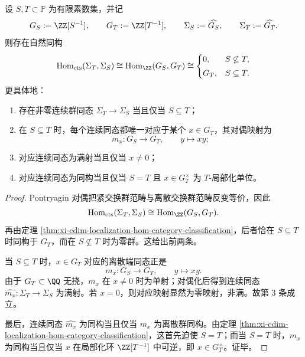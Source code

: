 \begin{theorem}\label{thm:xi-time-part60e-solenoid-terminal-morphism-classification}
设 \(S,T\subset\mathbb P\) 为有限素数集，并记
\[
G_S:=\ZZ[S^{-1}],
\qquad
G_T:=\ZZ[T^{-1}],
\qquad
\Sigma_S:=\widehat{G_S},
\qquad
\Sigma_T:=\widehat{G_T}.
\]
则存在自然同构
\[
\operatorname{Hom}_{\mathrm{cts}}(\Sigma_T,\Sigma_S)
\cong
\operatorname{Hom}_{\ZZ}(G_S,G_T)
\cong
\begin{cases}
0,& S\not\subseteq T,\\[1mm]
G_T,& S\subseteq T.
\end{cases}
\]
更具体地：
\begin{enumerate}
  \item 存在非零连续群同态 \(\Sigma_T\to\Sigma_S\) 当且仅当 \(S\subseteq T\)；
  \item 在 \(S\subseteq T\) 时，每个连续同态都唯一对应于某个 \(x\in G_T\)，其对偶映射为
  \[
  m_x:G_S\to G_T,
  \qquad
  y\mapsto xy;
  \]
  \item 对应连续同态为满射当且仅当 \(x\neq 0\)；
  \item 对应连续同态为同构当且仅当 \(S=T\) 且 \(x\in G_T^\times\) 为 \(T\)-局部化单位。
\end{enumerate}
\end{theorem}
\begin{proof}
Pontryagin 对偶把紧交换群范畴与离散交换群范畴反变等价，因此
\[
\operatorname{Hom}_{\mathrm{cts}}(\Sigma_T,\Sigma_S)
\cong
\operatorname{Hom}_{\ZZ}(G_S,G_T).
\]
再由定理 \ref{thm:xi-cdim-localization-hom-category-classification}，后者恰在 \(S\subseteq T\) 时同构于 \(G_T\)，而在 \(S\not\subseteq T\) 时为零群。这给出前两条。

当 \(S\subseteq T\) 时，\(x\in G_T\) 对应的离散端同态正是
\[
m_x:G_S\to G_T,\qquad y\mapsto xy.
\]
由于 \(G_T\subset\QQ\) 无挠，\(m_x\) 在 \(x\neq 0\) 时为单射；对偶化后得到连续同态 \(\widehat{m_x}:\Sigma_T\to\Sigma_S\) 为满射。若 \(x=0\)，则对应映射显然为零映射，非满。故第 \(3\) 条成立。

最后，连续同态 \(\widehat{m_x}\) 为同构当且仅当 \(m_x\) 为离散群同构。由定理 \ref{thm:xi-cdim-localization-hom-category-classification}，这首先迫使 \(S=T\)；而当 \(S=T\) 时，\(m_x\) 为同构当且仅当 \(x\) 在局部化环 \(\ZZ[T^{-1}]\) 中可逆，即 \(x\in G_T^\times\)。证毕。
\end{proof}

